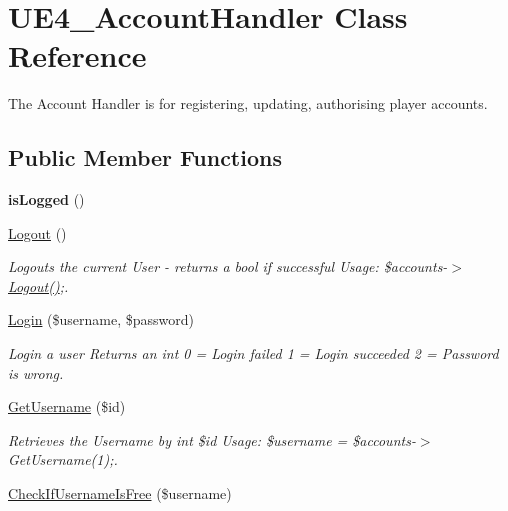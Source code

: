 \hypertarget{class_u_e4___account_handler}{\section{U\-E4\-\_\-\-Account\-Handler Class Reference}
\label{class_u_e4___account_handler}
}


The Account Handler is for registering, updating, authorising player accounts.  


\subsection*{Public Member Functions}
\begin{DoxyCompactItemize}
\item 
\hypertarget{class_u_e4___account_handler_a2e5051c30251e26c6da72ea9cfbe864f}{{\bfseries is\-Logged} ()}\label{class_u_e4___account_handler_a2e5051c30251e26c6da72ea9cfbe864f}

\item 
\hypertarget{class_u_e4___account_handler_aa14f760d541a59acb41ac8eefddafb9b}{\hyperlink{class_u_e4___account_handler_aa14f760d541a59acb41ac8eefddafb9b}{Logout} ()}\label{class_u_e4___account_handler_aa14f760d541a59acb41ac8eefddafb9b}

\begin{DoxyCompactList}\small\item\em Logouts the current User -\/ returns a bool if successful Usage\-: \$accounts-\/$>$\hyperlink{class_u_e4___account_handler_aa14f760d541a59acb41ac8eefddafb9b}{Logout()};. \end{DoxyCompactList}\item 
\hyperlink{class_u_e4___account_handler_a4a533e4b69f7790e6b74bff620275edc}{Login} (\$username, \$password)
\begin{DoxyCompactList}\small\item\em Login a user Returns an int 0 = Login failed 1 = Login succeeded 2 = Password is wrong. \end{DoxyCompactList}\item 
\hypertarget{class_u_e4___account_handler_a07f33f08153c4014c9e51225db2943c4}{\hyperlink{class_u_e4___account_handler_a07f33f08153c4014c9e51225db2943c4}{Get\-Username} (\$id)}\label{class_u_e4___account_handler_a07f33f08153c4014c9e51225db2943c4}

\begin{DoxyCompactList}\small\item\em Retrieves the Username by int \$id Usage\-: \$username = \$accounts-\/$>$Get\-Username(1);. \end{DoxyCompactList}\item 
\hypertarget{class_u_e4___account_handler_a7f82701030149995176babfd2741d724}{\hyperlink{class_u_e4___account_handler_a7f82701030149995176babfd2741d724}{Check\-If\-Username\-Is\-Free} (\$username)}\label{class_u_e4___account_handler_a7f82701030149995176babfd2741d724}


\end{DoxyCompactItemize}
